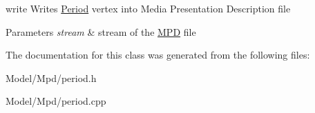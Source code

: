 write Writes \hyperlink{class_period}{Period} vertex into Media Presentation Description file 


\begin{DoxyParams}{Parameters}
{\em stream} & stream of the \hyperlink{class_m_p_d}{M\-P\-D} file \\
\hline
\end{DoxyParams}


The documentation for this class was generated from the following files\-:\begin{DoxyCompactItemize}
\item 
Model/\-Mpd/period.\-h\item 
Model/\-Mpd/period.\-cpp\end{DoxyCompactItemize}
